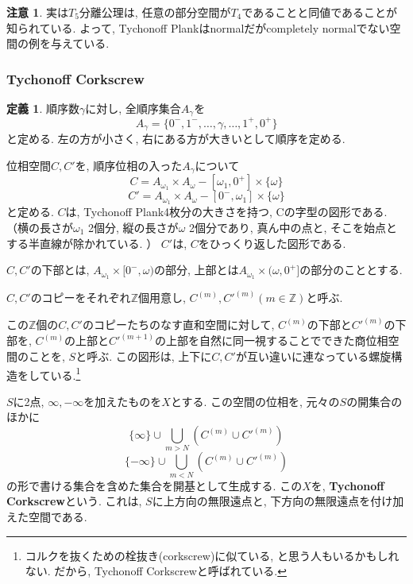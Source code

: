 \documentclass[a4paper, twoside]{bxjsarticle}
\newcommand{\zah}{\mathbb{Z}}
\theoremstyle{definition}
\newtheorem{defn}[thm]{定義}
\newtheorem{rem}[thm]{注意}
\begin{document}
        \begin{rem}
            実は$T_5$分離公理は, 任意の部分空間が$T_4$であることと同値であることが知られている. よって, Tychonoff Plankはnormalだがcompletely normalでない空間の例を与えている.
        \end{rem}
    \subsubsection{Tychonoff Corkscrew}
        \begin{defn}
            順序数$\gamma$に対し, 全順序集合$A_\gamma$を
            \[A_\gamma = \{0^-, 1^-, \dots , \gamma, \dots , 1^+, 0^+\}\]
            と定める. 左の方が小さく, 右にある方が大きいとして順序を定める.
            
            位相空間$C, C'$を, 順序位相の入った$A_\gamma$について
            \[C = A_{\omega_1}\times A_\omega - [\omega_1, 0^+]\times\{\omega\}\]
            \[C'= A_{\omega_1}\times A_\omega - [0^-, \omega_1]\times\{\omega\}\]
            と定める. $C$は, Tychonoff Plank4枚分の大きさを持つ, Cの字型の図形である. （横の長さが$\omega_1$ 2個分, 縦の長さが$\omega$ 2個分であり, 真ん中の点と, そこを始点とする半直線が除かれている. ） $C'$は, $C$をひっくり返した図形である.
            
            $C, C'$の下部とは, $A_{\omega_1}\times[0^-, \omega)$の部分, 上部とは$A_{\omega_1}\times(\omega, 0^+]$の部分のこととする.
            
            $C, C'$のコピーをそれぞれ$\zah$個用意し, $C^{(m)}, C'^{(m)} (m\in \zah)$と呼ぶ.
            
            この$\zah$個の$C, C'$のコピーたちのなす直和空間に対して, $C^{(m)}$の下部と$C'^{(m)}$の下部を, $C^{(m)}$の上部と$C'^{(m+1)}$の上部を自然に同一視することでできた商位相空間のことを, $S$と呼ぶ. この図形は, 上下に$C, C'$が互い違いに連なっている螺旋構造をしている.\footnote{コルクを抜くための栓抜き(corkscrew)に似ている, と思う人もいるかもしれない. だから, Tychonoff Corkscrewと呼ばれている.}
            
            $S$に2点, $\infty, -\infty$を加えたものを$X$とする. この空間の位相を, 元々の$S$の開集合のほかに
            \[\{\infty\}\cup \bigcup_{m>N} (C^{(m)}\cup C'^{(m)})\]
            \[\{-\infty\}\cup \bigcup_{m<N} (C^{(m)}\cup C'^{(m)})\]
            の形で書ける集合を含めた集合を開基として生成する. この$X$を, \textbf{Tychonoff Corkscrew}という. これは, $S$に上方向の無限遠点と, 下方向の無限遠点を付け加えた空間である. 
        \end{defn}
\end{document}
